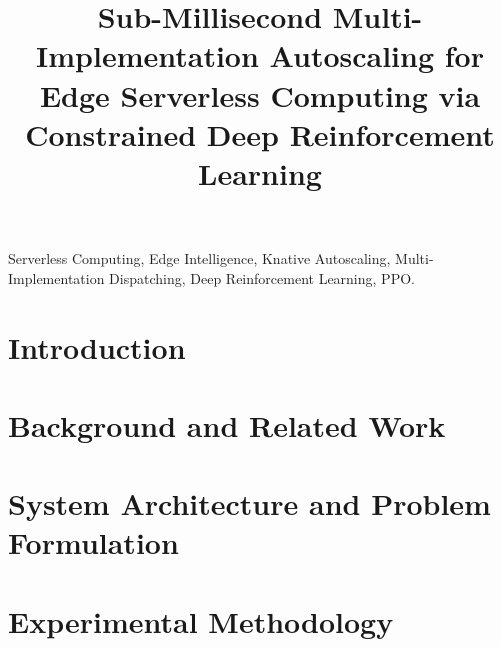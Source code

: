 \documentclass[conference]{IEEEtran}
\begin{document}
\title{Sub-Millisecond Multi-Implementation Autoscaling for Edge Serverless Computing via Constrained Deep Reinforcement Learning}

\author{}

\maketitle

\begin{abstract}
\end{abstract}

\begin{IEEEkeywords}
Serverless Computing, Edge Intelligence, Knative Autoscaling, Multi-Implementation Dispatching, Deep Reinforcement Learning, PPO.
\end{IEEEkeywords}

\section{Introduction}

\section{Background and Related Work}

\section{System Architecture and Problem Formulation}

\section{Experimental Methodology}
\end{document}
